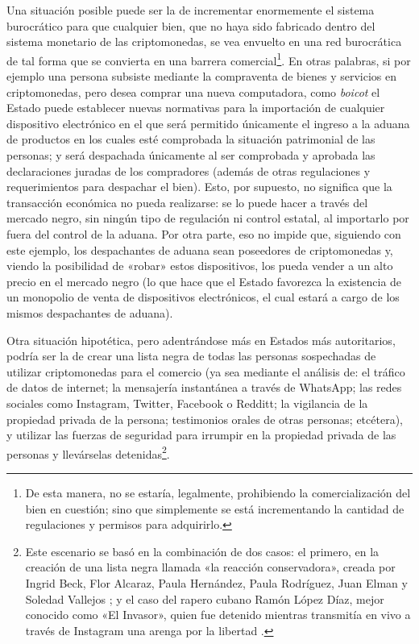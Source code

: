\documentclass[12pt,a4paper,twoside]{book}
\begin{document}
Una situación posible puede ser la de incrementar enormemente el sistema burocrático para que cualquier bien, que no haya sido fabricado dentro del sistema monetario de las criptomonedas, se vea envuelto en una red burocrática de tal forma que se convierta en una barrera comercial\footnote{De esta manera, no se estaría, legalmente, prohibiendo la comercialización del bien en cuestión; sino que simplemente se está incrementando la cantidad de regulaciones y permisos para adquirirlo.}. En otras palabras, si por ejemplo una persona subsiste mediante la compraventa de bienes y servicios en criptomonedas, pero desea comprar una nueva computadora, como \textit{boicot} el Estado puede establecer nuevas normativas para la importación de cualquier dispositivo electrónico en el que será permitido únicamente el ingreso a la aduana de productos en los cuales esté comprobada la situación patrimonial de las personas; y será despachada únicamente al ser comprobada y aprobada las declaraciones juradas de los compradores (además de otras regulaciones y requerimientos para despachar el bien). Esto, por supuesto, no significa que la transacción económica no pueda realizarse: se lo puede hacer a través del mercado negro, sin ningún tipo de regulación ni control estatal, al importarlo por fuera del control de la aduana. Por otra parte, eso no impide que, siguiendo con este ejemplo, los despachantes de aduana sean poseedores de criptomonedas y, viendo la posibilidad de «robar» estos dispositivos, los pueda vender a un alto precio en el mercado negro (lo que hace que el Estado favorezca la existencia de un monopolio de venta de dispositivos electrónicos, el cual estará a cargo de los mismos despachantes de aduana).

Otra situación hipotética, pero adentrándose más en Estados más autoritarios, podría ser la de crear una lista negra de todas las personas sospechadas de utilizar criptomonedas para el comercio (ya sea mediante el análisis de: el tráfico de datos de internet; la mensajería instantánea a través de WhatsApp; las redes sociales como Instagram, Twitter, Facebook o Redditt; la vigilancia de la propiedad privada de la persona; testimonios orales de otras personas; etcétera), y utilizar las fuerzas de seguridad para irrumpir en la propiedad privada de las personas y llevárselas detenidas\footnote{Este escenario se basó en la combinación de dos casos: el primero, en la creación de una lista negra llamada «la reacción conservadora», creada por Ingrid Beck, Flor Alcaraz, Paula Hernández, Paula Rodríguez, Juan Elman y Soledad Vallejos \cite{listanegra}; y el caso del rapero cubano Ramón López Díaz, mejor conocido como «El Invasor», quien fue detenido mientras transmitía en vivo a través de Instagram una arenga por la libertad \cite{raperocubano}.}.
\end{document}
